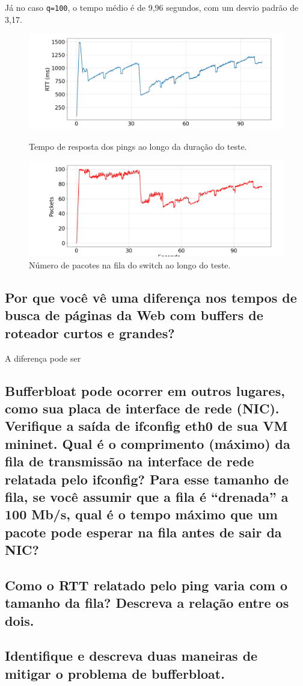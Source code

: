 \documentclass[a4paper,12pt]{article}
\newcommand{\code}[1]{\texttt{#1}}
\begin{document}
\newpage

Já no caso \code{q=100}, o tempo médio é de 9,96 segundos, com um desvio padrão de 3,17.

\begin{figure}[h!]
  \centering
  \includegraphics[width=0.5\columnwidth]{./bufferbloat/reno-rtt-q100.png}
  \caption{Tempo de resposta dos pings ao longo da duração do teste.}
  \includegraphics[width=0.5\columnwidth]{./bufferbloat/reno-buffer-q100.png}
  \caption{Número de pacotes na fila do switch ao longo do teste.}
\end{figure}

\subsection{Por que você vê uma diferença nos tempos de busca de páginas da Web com buffers de roteador curtos e grandes?}

A diferença pode ser 

\subsection{Bufferbloat pode ocorrer em outros lugares, como sua placa de interface de rede (NIC). Verifique a saída de ifconfig eth0 de sua VM mininet. Qual é o comprimento (máximo) da fila de transmissão na interface de rede relatada pelo ifconfig? Para esse tamanho de fila, se você assumir que a fila é “drenada” a 100 Mb/s, qual é o tempo máximo que um pacote pode esperar na fila antes de sair da NIC?
}

\subsection{Como o RTT relatado pelo ping varia com o tamanho da fila? Descreva a relação entre os dois.}

\subsection{Identifique e descreva duas maneiras de mitigar o problema de bufferbloat.}

\end{document}
